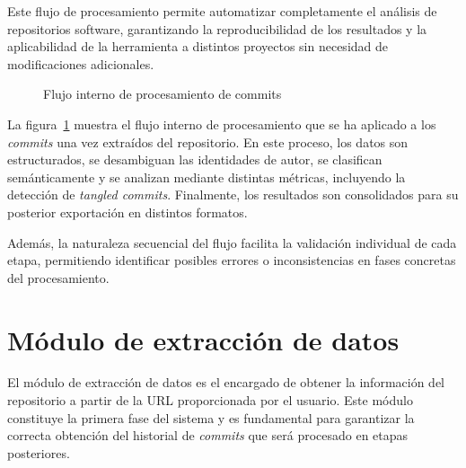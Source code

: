 \documentclass[a4paper, 12pt]{book}
\begin{document}
Este flujo de procesamiento permite automatizar completamente el análisis de repositorios software, garantizando la reproducibilidad de los resultados y la aplicabilidad de la herramienta a distintos proyectos sin necesidad de modificaciones adicionales.

\begin{figure}[H]
\centering
{}
\caption{Flujo interno de procesamiento de commits}
\label{fig:flujo_commits}
\end{figure}

La figura~\ref{fig:flujo_commits} muestra el flujo interno de procesamiento que se ha aplicado a los \emph{commits} una vez extraídos del repositorio. En este proceso, los datos son estructurados, se desambiguan las identidades de autor, se clasifican semánticamente y se analizan mediante distintas métricas, incluyendo la detección de \emph{tangled commits}. Finalmente, los resultados son consolidados para su posterior exportación en distintos formatos.


Además, la naturaleza secuencial del flujo facilita la validación individual de cada etapa, permitiendo identificar posibles errores o inconsistencias en fases concretas del procesamiento.

\section{Módulo de extracción de datos}
\label{sec:extraccion}

El módulo de extracción de datos es el encargado de obtener la información del repositorio a partir de la URL proporcionada por el usuario. Este módulo constituye la primera fase del sistema y es fundamental para garantizar la correcta obtención del historial de \emph{commits} que será procesado en etapas posteriores.
\end{document}
